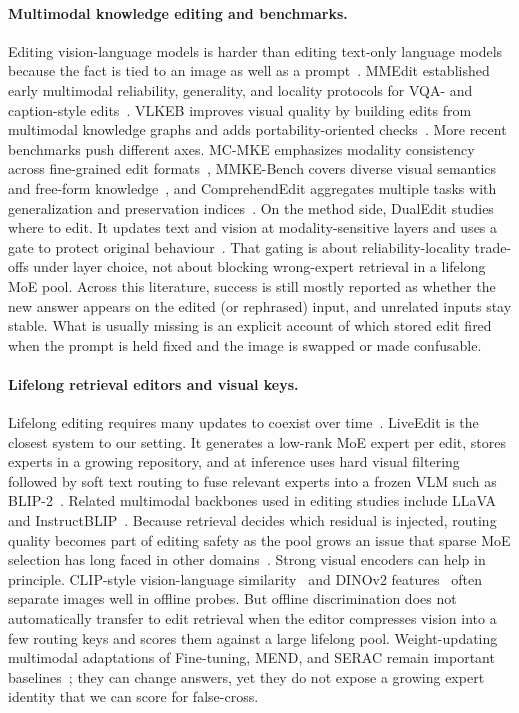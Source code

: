 \documentclass[letterpaper]{article} %
\begin{document}
\paragraph{Multimodal knowledge editing and benchmarks.}
Editing vision-language models is harder than editing text-only language models because the fact is tied to an image as well as a prompt~\citep{cheng2023mmedit}.
MMEdit established early multimodal reliability, generality, and locality protocols for VQA- and caption-style edits~\citep{cheng2023mmedit}.
VLKEB improves visual quality by building edits from multimodal knowledge graphs and adds portability-oriented checks~\citep{huang2024vlkeb}.
More recent benchmarks push different axes. MC-MKE emphasizes modality consistency across fine-grained edit formats~\citep{zhang2025mcmke}, MMKE-Bench covers diverse visual semantics and free-form knowledge~\citep{jiang2025mmke}, and ComprehendEdit aggregates multiple tasks with generalization and preservation indices~\citep{ma2025comprehendedit}.
On the method side, DualEdit studies where to edit. It updates text and vision at modality-sensitive layers and uses a gate to protect original behaviour~\citep{shi2025dualedit}.
That gating is about reliability-locality trade-offs under layer choice, not about blocking wrong-expert retrieval in a lifelong MoE pool.
Across this literature, success is still mostly reported as whether the new answer appears on the edited (or rephrased) input, and unrelated inputs stay stable.
What is usually missing is an explicit account of which stored edit fired when the prompt is held fixed and the image is swapped or made confusable.

\paragraph{Lifelong retrieval editors and visual keys.}
Lifelong editing requires many updates to coexist over time~\citep{hartvigsen2023grace,chen2025liveedit}.
LiveEdit is the closest system to our setting. It generates a low-rank MoE expert per edit, stores experts in a growing repository, and at inference uses hard visual filtering followed by soft text routing to fuse relevant experts into a frozen VLM such as BLIP-2~\citep{chen2025liveedit,li2023blip2}.
Related multimodal backbones used in editing studies include LLaVA and InstructBLIP~\citep{liu2023llava,dai2023instructblip}.
Because retrieval decides which residual is injected, routing quality becomes part of editing safety as the pool grows an issue that sparse MoE selection has long faced in other domains~\citep{shazeer2017moe}.
Strong visual encoders can help in principle. CLIP-style vision-language similarity~\citep{radford2021clip} and DINOv2 features~\citep{oquab2024dinov2} often separate images well in offline probes.
But offline discrimination does not automatically transfer to edit retrieval when the editor compresses vision into a few routing keys and scores them against a large lifelong pool.
Weight-updating multimodal adaptations of Fine-tuning, MEND, and SERAC remain important baselines~\citep{Mitchell2021FastME,mitchell2022serac,cheng2023mmedit}; they can change answers, yet they do not expose a growing expert identity that we can score for false-cross.
\end{document}
